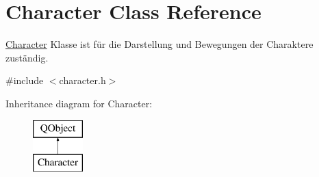 \hypertarget{class_character}{}\section{Character Class Reference}
\label{class_character}


\hyperlink{class_character}{Character} Klasse ist für die Darstellung und Bewegungen der Charaktere zuständig.  




{\ttfamily \#include $<$character.\+h$>$}

Inheritance diagram for Character\+:\begin{figure}[H]
\begin{center}
\leavevmode
\includegraphics[height=2.000000cm]{class_character}
\end{center}
\end{figure}
